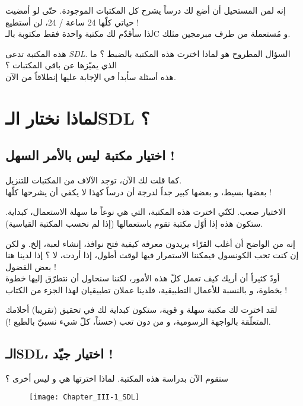 إنه لمن المستحيل أن أضع لك درساً يشرح كل المكتبات الموجودة. حتّى لو أمضيت حياتي كلّها 24 ساعة / 24، لن أستطيع !\\
لذا سأقدّم لك مكتبة واحدة فقط مكتوبة بالـ\textenglish{C} و مُستعملة من طرف مبرمجين مثلك. 

هذه المكتبة تدعى 
\textit{\textenglish{SDL}}.
السؤال المطروح هو لماذا اخترت هذه المكتبة بالضبط ؟ ما الذي يميّزها عن باقي المكتبات ؟\\
هذه أسئلة سأبدأ في الإجابة عليها إنطلاقاً من الآن.

\section{لماذا نختار الـ\textenglish{SDL} ؟}

\subsection{اختيار مكتبة ليس بالأمر السهل !}

كما قلت لك الآن، توجد الآلاف من المكتبات للتنزيل.\\
بعضها بسيط، و بعضها كبير جداً لدرجة أن درساً كهذا لا يكفي أن يشرحها كلّها !

الاختيار صعب. لكنّي اخترت هذه المكتبة، التي هي نوعاً ما سهلة الاستعمال، كبداية. ستكون هذه إذا أوّل مكتبة تقوم باستعمالها (إذا لم نحسب المكتبة القياسية).

إنه من الواضح أن أغلب القرّاء يريدون معرفة كيفية فتح نوافذ، إنشاء لعبة، إلخ. و لكن إن كنت تحب الكونسول فيمكننا الاستمرار فيها لوقت أطول، إذا أردت، لا ؟ إذا لدينا هنا بعض الفضول ! \\
أودّ كثيراً أن أريك كيف تعمل كلّ هذه الأمور، لكننا سنحاول أن نتطرّق إليها خطوة بخطوة، و بالنسبة للأعمال التطبيقية، فلدينا عملان تطبيقيان لهذا الجزء من الكتاب !

لقد اخترت لك مكتبة سهلة و قوية، ستكون كبداية لك في تحقيق (تقريبا) أحلامك المتعلّقة بالواجهة الرسومية، و من دون تعب (حسناً، كلّ شيء نسبيّ بالطبع !).
\subsection{الـ\textenglish{SDL}، اختيار جيّد !}

سنقوم الآن بدراسة هذه المكتبة. لماذا اخترتها هي و ليس أخرى ؟

\begin{figure}[H]
	\centering
	\texttt{[image: Chapter\_III-1\_SDL]}
\end{figure}

